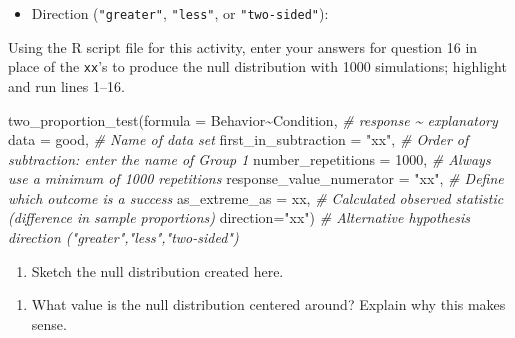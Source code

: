 \documentclass[
]{report}
\newenvironment{Shaded}{\begin{snugshade}}{\end{snugshade}}
\newcommand{\AttributeTok}[1]{\textcolor[rgb]{0.77,0.63,0.00}{#1}}
\newcommand{\CommentTok}[1]{\textcolor[rgb]{0.56,0.35,0.01}{\textit{#1}}}
\newcommand{\DecValTok}[1]{\textcolor[rgb]{0.00,0.00,0.81}{#1}}
\newcommand{\FunctionTok}[1]{\textcolor[rgb]{0.00,0.00,0.00}{#1}}
\newcommand{\NormalTok}[1]{#1}
\newcommand{\SpecialCharTok}[1]{\textcolor[rgb]{0.00,0.00,0.00}{#1}}
\newcommand{\StringTok}[1]{\textcolor[rgb]{0.31,0.60,0.02}{#1}}
\providecommand{\tightlist}{%
  \setlength{\itemsep}{0pt}\setlength{\parskip}{0pt}}
\begin{document}
\vspace{.15in}

\begin{itemize}
\tightlist
\item
  Direction (\texttt{"greater"}, \texttt{"less"}, or \texttt{"two-sided"}):
\end{itemize}

\vspace{.15in}

Using the R script file for this activity, enter your answers for question 16 in place of the \texttt{xx}'s to produce the null distribution with 1000 simulations; highlight and run lines 1--16.

\begin{Shaded}
\begin{Highlighting}[]
\FunctionTok{two\_proportion\_test}\NormalTok{(}\AttributeTok{formula =}\NormalTok{ Behavior}\SpecialCharTok{\textasciitilde{}}\NormalTok{Condition, }\CommentTok{\# response \textasciitilde{} explanatory}
    \AttributeTok{data =}\NormalTok{ good, }\CommentTok{\# Name of data set}
    \AttributeTok{first\_in\_subtraction =} \StringTok{"xx"}\NormalTok{, }\CommentTok{\# Order of subtraction: enter the name of Group 1}
    \AttributeTok{number\_repetitions =} \DecValTok{1000}\NormalTok{, }\CommentTok{\# Always use a minimum of 1000 repetitions}
    \AttributeTok{response\_value\_numerator =} \StringTok{"xx"}\NormalTok{, }\CommentTok{\# Define which outcome is a success }
    \AttributeTok{as\_extreme\_as =}\NormalTok{ xx, }\CommentTok{\# Calculated observed statistic (difference in sample proportions)}
    \AttributeTok{direction=}\StringTok{"xx"}\NormalTok{) }\CommentTok{\# Alternative hypothesis direction ("greater","less","two{-}sided")}
\end{Highlighting}
\end{Shaded}

\begin{enumerate}
\def\labelenumi{\arabic{enumi}.}
\setcounter{enumi}{16}
\tightlist
\item
  Sketch the null distribution created here.
\end{enumerate}

\vspace{1.5in}

\begin{enumerate}
\def\labelenumi{\arabic{enumi}.}
\setcounter{enumi}{17}
\tightlist
\item
  What value is the null distribution centered around? Explain why this makes sense.
\end{enumerate}
\end{document}
